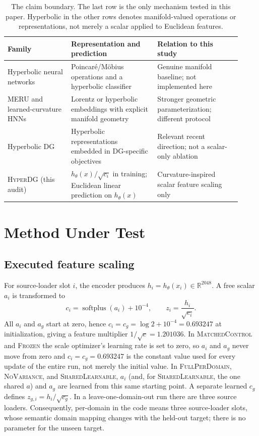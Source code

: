\documentclass[10pt]{article}
\newcommand{\method}{\textsc{HyperDG}}
\newcommand{\full}{\textsc{FullPerDomain}}
\newcommand{\shared}{\textsc{SharedLearnable}}
\newcommand{\novar}{\textsc{NoVariance}}
\begin{document}
\begin{table}[t]
\centering
\small
\caption{The claim boundary. The last row is the only mechanism tested in this
paper. Hyperbolic in the other rows denotes manifold-valued operations or
representations, not merely a scalar applied to Euclidean features.}
\label{tab:scope-boundary}
\begin{tabular}{p{0.25\linewidth}p{0.34\linewidth}p{0.33\linewidth}}
\toprule
Family & Representation and prediction & Relation to this study \\
\midrule
Hyperbolic neural networks
\citep{ganea2018hyperbolic} &
Poincar\'e/M\"obius operations and a hyperbolic classifier &
Genuine manifold baseline; not implemented here \\
MERU and learned-curvature HNNs
\citep{desai2023meru,fan2025curvaturelearning} &
Lorentz or hyperbolic embeddings with explicit manifold geometry &
Stronger geometric parameterization; different protocol \\
Hyperbolic DG
\citep{bi2025hyperbolic,disalvo2026hypcbc} &
Hyperbolic representations embedded in DG-specific objectives &
Relevant recent direction; not a scalar-only ablation \\
\method{} (this audit) &
$h_\theta(x)/\sqrt{c_i}$ in training; Euclidean linear prediction on
$h_\theta(x)$ &
Curvature-inspired scalar feature scaling only \\
\bottomrule
\end{tabular}
\end{table}

\section{Method Under Test}
\label{sec:method}

\subsection{Executed feature scaling}

For source-loader slot $i$, the encoder produces
$h_i=h_\theta(x_i)\in\mathbb{R}^{2048}$. A free scalar $a_i$ is transformed to
\begin{equation}
c_i=\operatorname{softplus}(a_i)+10^{-4}, \qquad
z_i=\frac{h_i}{\sqrt{c_i}} .
\label{eq:scale}
\end{equation}
All $a_i$ and $a_g$ start at zero, hence
$c_i=c_g=\log2+10^{-4}=0.693247$ at initialization, giving a feature
multiplier $1/\sqrt{c}=1.201036$. In \textsc{MatchedControl} and
\textsc{Frozen} the scale optimizer's learning rate is set to zero, so $a_i$
and $a_g$ never move from zero and $c_i=c_g=0.693247$ is the constant value
used for every update of the entire run, not merely the initial value. In
\full{}, \novar{}, and \shared{}, $a_i$ (and, for \shared{}, the one shared
$a$) and $a_g$ are learned from this same starting point. A separate learned
$c_g$ defines $z_{g,i}=h_i/\sqrt{c_g}$. In a leave-one-domain-out run there
are three source loaders. Consequently, per-domain in the code means three
source-loader slots, whose semantic domain mapping changes with the held-out
target; there is no parameter for the unseen target.
\end{document}
